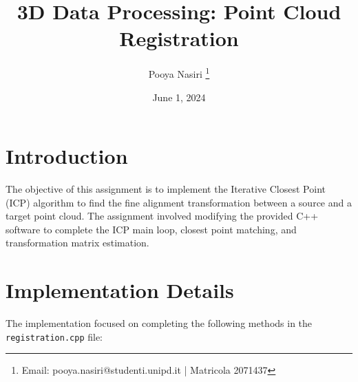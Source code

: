 \documentclass{article}
\title{3D Data Processing: Point Cloud Registration}
\author{Pooya Nasiri \thanks{Email: pooya.nasiri@studenti.unipd.it | Matricola 2071437}}
\date{June 1, 2024}
\begin{document}
\maketitle

\section{Introduction}
The objective of this assignment is to implement the Iterative Closest Point (ICP) algorithm to find the fine alignment transformation between a source and a target point cloud. The assignment involved modifying the provided C++ software to complete the ICP main loop, closest point matching, and transformation matrix estimation.




\section{Implementation Details}
The implementation focused on completing the following methods \newline in the \texttt{registration.cpp} file:
\end{document}
